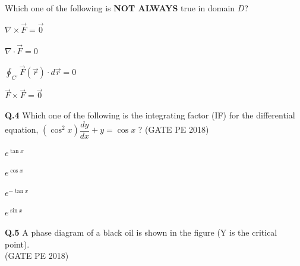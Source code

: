 \documentclass[journal,12pt,onecolumn]{IEEEtran}
\theoremstyle{remark}
\begin{document}
\noindent
Which one of the following is \textbf{NOT ALWAYS} true in domain $D$?

\begin{enumerate}
\begin{multicols}{2}
\item $\nabla \times \vec{F} = \vec{0}$  \item $\nabla \cdot \vec{F} = 0$ \hspace{2em}
\item $\oint_{C'} \vec{F}(\vec{r}) \cdot d\vec{r} = 0$  \item $\vec{F} \times \vec{F} = \vec{0}$
\end{multicols}
\end{enumerate}

\noindent
\textbf{Q.4} Which one of the following is the integrating factor (IF) for the differential equation, $(\cos^2 x)\dfrac{dy}{dx} + y = \cos x$ ? \hfill(GATE PE 2018)


\begin{enumerate}
\begin{multicols}{2}
\item $e^{\tan x}$  \item $e^{\cos x}$ 
\item $e^{-\tan x}$  \item $e^{\sin x}$
\end{multicols}
\end{enumerate}

\pagebreak

\noindent
\textbf{Q.5} A phase diagram of a black oil is shown in the figure (Y is the critical point).\\\hfill(GATE PE 2018)
\end{document}
